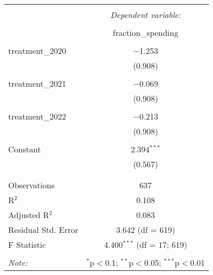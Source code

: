 
\begin{table}[!htbp] \centering 
  \caption{} 
  \label{} 
\begin{tabular}{@{\extracolsep{5pt}}lc} 
\\[-1.8ex]\hline 
\hline \\[-1.8ex] 
 & \multicolumn{1}{c}{\textit{Dependent variable:}} \\ 
\cline{2-2} 
\\[-1.8ex] & fraction\_spending \\ 
\hline \\[-1.8ex] 
 treatment\_2020 & $-$1.253 \\ 
  & (0.908) \\ 
  & \\ 
 treatment\_2021 & $-$0.069 \\ 
  & (0.908) \\ 
  & \\ 
 treatment\_2022 & $-$0.213 \\ 
  & (0.908) \\ 
  & \\ 
 Constant & 2.394$^{***}$ \\ 
  & (0.567) \\ 
  & \\ 
\hline \\[-1.8ex] 
Observations & 637 \\ 
R$^{2}$ & 0.108 \\ 
Adjusted R$^{2}$ & 0.083 \\ 
Residual Std. Error & 3.642 (df = 619) \\ 
F Statistic & 4.400$^{***}$ (df = 17; 619) \\ 
\hline 
\hline \\[-1.8ex] 
\textit{Note:}  & \multicolumn{1}{r}{$^{*}$p$<$0.1; $^{**}$p$<$0.05; $^{***}$p$<$0.01} \\ 
\end{tabular} 
\end{table} 
